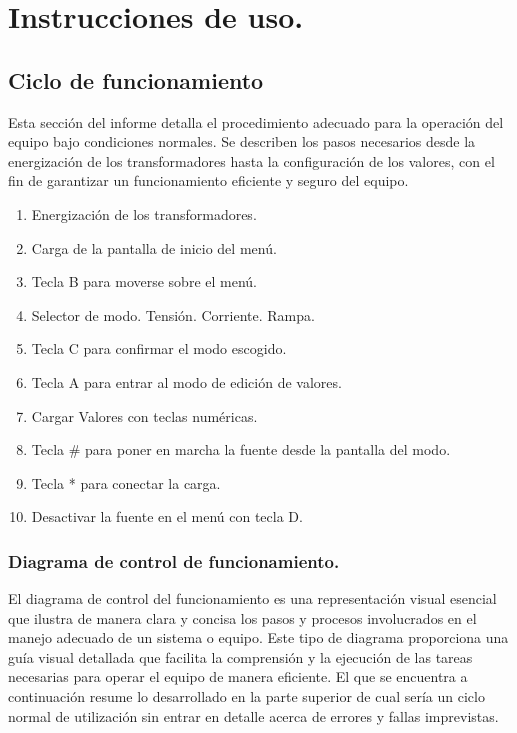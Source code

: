 \chapter{Instrucciones de uso.}

\label{C:Forma de operar la fuente DC}

\section{Ciclo de funcionamiento}

Esta sección del informe detalla el procedimiento adecuado para la operación del equipo bajo condiciones normales. Se describen los pasos necesarios desde la energización de los transformadores hasta la configuración de los valores, con el fin de garantizar un funcionamiento eficiente y seguro del equipo.

\begin{enumerate}
    \item Energización de los transformadores.
    \item Carga de la pantalla de inicio del menú.
    \item Tecla B para moverse sobre el menú.
    \item Selector de modo. Tensión. Corriente. Rampa.
    \item Tecla C para confirmar el modo escogido.
    \item Tecla A para entrar al modo de edición de valores.
    \item Cargar Valores con teclas numéricas.
    \item Tecla \# para poner en marcha la fuente desde la pantalla del modo.
    \item Tecla * para conectar la carga.
    \item Desactivar la fuente en el menú con tecla D.
\end{enumerate}

\subsection{Diagrama de control de funcionamiento.}

El diagrama de control del funcionamiento es una representación visual esencial que ilustra de manera clara y concisa los pasos y procesos involucrados en el manejo adecuado de un sistema o equipo. Este tipo de diagrama proporciona una guía visual detallada que facilita la comprensión y la ejecución de las tareas necesarias para operar el equipo de manera eficiente. El que se encuentra a continuación resume lo desarrollado en la parte superior de cual sería un ciclo normal de utilización sin entrar en detalle acerca de errores y fallas imprevistas. 


